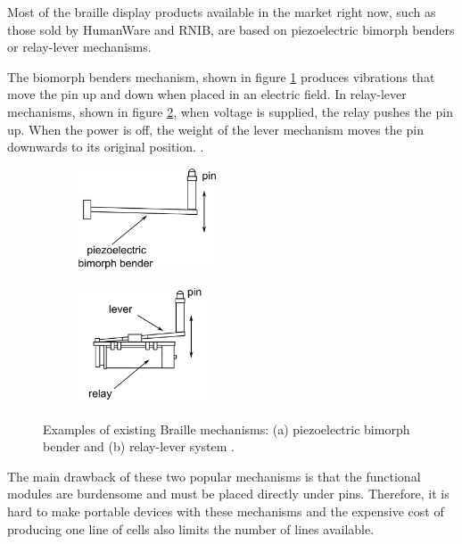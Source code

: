 Most of the braille display products available in the market right now, such as those sold by HumanWare and RNIB, are based on piezoelectric bimorph benders or relay-lever mechanisms.  

The biomorph benders mechanism, shown in figure \ref{fig:piezo-bender} produces vibrations that move the pin up and down when placed in an electric field.
In relay-lever mechanisms, shown in figure \ref{fig:piezo-relay}, when voltage is supplied, the relay pushes the pin up. When the power is off, the weight of the lever mechanism moves the pin downwards to its original position. \cite{hernandez_characterization_2009}.

\begin{figure} \centering
    \begin{subfigure}[b]{0.4\textwidth}\centering
        \includegraphics[height=3cm]{figures/piezo-bender-a.png}
        \caption{}
        \label{fig:piezo-bender}
    \end{subfigure}
    \begin{subfigure}[b]{0.4\textwidth}\centering
        \includegraphics[height=3.5cm]{figures/piezo-bender-b.png}
        \caption{}
        \label{fig:piezo-relay}
    \end{subfigure}
\caption[Examples of existing Braille mechanisms]{Examples of existing Braille mechanisms: (a) piezoelectric bimorph bender and (b) relay-lever system \cite{hernandez_characterization_2009}.}
\label{fig:piezo-bender-schema}
\end{figure}

The main drawback of these two popular mechanisms is that the functional modules are burdensome and must be placed directly under pins. Therefore, it is hard to make portable devices with these mechanisms and the expensive cost of producing one line of cells also limits the number of lines available. 

